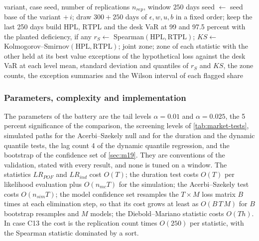

\begin{algorithm}[htbp]
\caption{Measurement of one variant of the desk case C13: replications through the engine.}
\label{alg:mk-desk}
\begin{algorithmic}[1]
\Require variant, case seed, number of replications $n_{rep}$, window $250$ days
\State seed $\gets$ seed base of the variant $+\,i$; draw $300+250$ days of $\epsilon,w,u,b$ in a fixed order; keep the last 250 days
\State build $\mathrm{HPL}$, $\mathrm{RTPL}$ and the desk VaR at 99 and 97.5 percent with the planted deficiency, if any
\State $r_S\gets$ Spearman$(\mathrm{HPL},\mathrm{RTPL})$; $KS\gets$ Kolmogorov--Smirnov$(\mathrm{HPL},\mathrm{RTPL})$; joint zone; zone of each statistic with the other held at its best value
\State exceptions of the hypothetical loss against the desk VaR at each level
\EndFor
\State \Return mean, standard deviation and quantiles of $r_S$ and $KS$, the zone counts, the exception summaries and the Wilson interval of each flagged share
\end{algorithmic}
\end{algorithm}

\subsubsection{Parameters, complexity and implementation}
The parameters of the battery are the tail levels $\alpha=0.01$ and $\alpha=0.025$, the 5 percent significance of the comparison, the screening levels of \cref{tab:market-tests}, \mkZDraws{} simulated paths
for the Acerbi--Szekely null and \mkMcDraws{} for the duration and the dynamic quantile tests, the lag count 4 of the dynamic quantile regression, and the bootstrap of the confidence set of
\cref{sec:m19}. They are conventions of the validation, stated with every result, and none is tuned on a window. The statistics $LR_{POF}$ and $LR_{ind}$ cost $O(T)$; the duration test
costs $O(T)$ per likelihood evaluation plus $O(n_{mc}T)$ for the simulation; the Acerbi--Szekely test costs $O(n_{sim}T)$; the model confidence set resamples the $T\times M$ loss matrix $B$ times at each elimination step, so that
its cost grows at least as $O(B\,T\,M)$ for $B$ bootstrap resamples and $M$ models; the Diebold--Mariano statistic costs $O(Th)$. In case C13 the cost is the replication count times $O(250)$ per statistic, with the
Spearman statistic dominated by a sort.

